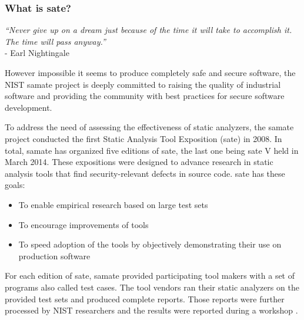 \vspace{0.5cm}

\subsubsection{What is \gls{sate}?}

\vspace{0.5cm}

\begin{flushright}
    \emph{``Never give up on a dream just because of the time it will take to accomplish it.\\ The time will pass anyway.''\\}
    - Earl Nightingale
\end{flushright}

However impossible it seems to produce completely safe and secure software, the NIST \gls{samate} project is deeply committed to raising the quality of industrial software and providing the community with best practices for secure software development.

To address the need of assessing the effectiveness of static analyzers, the \gls{samate} project conducted the first Static Analysis Tool Exposition (\gls{sate}) in 2008. In total, \gls{samate} has organized five editions of \gls{sate}, the last one being \gls{sate} V held in March 2014. These expositions were designed to advance research in static analysis tools that find security-relevant defects in source code. \gls{sate} has these goals:

\begin{itemize}
    \item To enable empirical research based on large test sets
    \item To encourage improvements of tools
    \item To speed adoption of the tools by objectively demonstrating their use on production software
\end{itemize}

For each edition of \gls{sate}, \gls{samate} provided participating tool makers with a set of programs also called test cases. The tool vendors ran their static analyzers on the provided test sets and produced complete reports. Those reports were further processed by NIST researchers and the results were reported during a workshop \cite{okun2010second,okun2011report,okun2013report,okun2009static,okun2016sate}.

\vspace{0.5cm}

